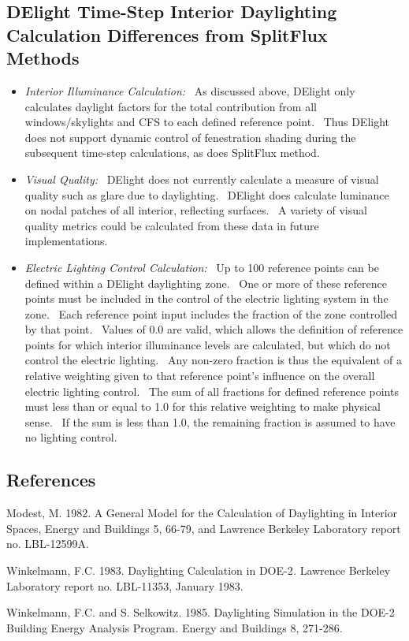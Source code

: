 \subsection{DElight Time-Step Interior Daylighting Calculation Differences from SplitFlux Methods}\label{delight-time-step-interior-daylighting-calculation-differences-from-energyplus-detailed-methods}

\begin{itemize}
\item
  \emph{Interior Illuminance Calculation:}~ As discussed above, DElight only calculates daylight factors for the total contribution from all windows/skylights and CFS to each defined reference point.~ Thus DElight does not support dynamic control of fenestration shading during the subsequent time-step calculations, as does SplitFlux method.
\item
  \emph{Visual Quality:}~ DElight does not currently calculate a measure of visual quality such as glare due to daylighting.~ DElight does calculate luminance on nodal patches of all interior, reflecting surfaces.~ A variety of visual quality metrics could be calculated from these data in future implementations.
\item
  \emph{Electric Lighting Control Calculation:}~ Up to 100 reference points can be defined within a DElight daylighting zone.~ One or more of these reference points must be included in the control of the electric lighting system in the zone.~ Each reference point input includes the fraction of the zone controlled by that point.~ Values of 0.0 are valid, which allows the definition of reference points for which interior illuminance levels are calculated, but which do not control the electric lighting.~ Any non-zero fraction is thus the equivalent of a relative weighting given to that reference point's influence on the overall electric lighting control.~ The sum of all fractions for defined reference points must less than or equal to 1.0 for this relative weighting to make physical sense.~ If the sum is less than 1.0, the remaining fraction is assumed to have no lighting control.
\end{itemize}

\subsection{References}\label{references-017}

Modest, M. 1982. A General Model for the Calculation of Daylighting in Interior Spaces, Energy and Buildings 5, 66-79, and Lawrence Berkeley Laboratory report no. LBL-12599A.

Winkelmann, F.C. 1983. Daylighting Calculation in DOE-2\emph{.} Lawrence Berkeley Laboratory report no. LBL-11353, January 1983.

Winkelmann, F.C. and S. Selkowitz. 1985. Daylighting Simulation in the DOE-2 Building Energy Analysis Program\emph{.} Energy and Buildings 8, 271-286.
